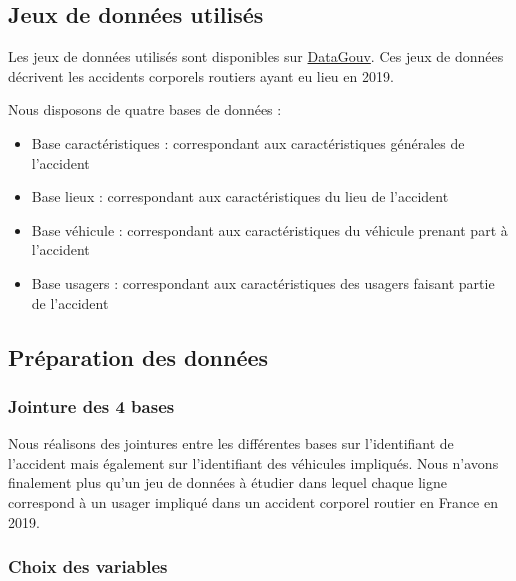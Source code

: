 \documentclass[french,]{tp}
\providecommand{\tightlist}{%
  \setlength{\itemsep}{0pt}\setlength{\parskip}{0pt}}
\begin{document}
\hypertarget{jeux-donnees}{%
\subsection{Jeux de données utilisés}\label{jeux-donnees}}

Les jeux de données utilisés sont disponibles sur \href{https://www.data.gouv.fr/fr/datasets/bases-de-donnees-annuelles-des-accidents-corporels-de-la-circulation-routiere-annees-de-2005-a-2019/}{DataGouv}. Ces jeux de données décrivent les accidents corporels routiers ayant eu lieu en 2019.

Nous disposons de quatre bases de données :

\begin{itemize}
\tightlist
\item
  Base caractéristiques : correspondant aux caractéristiques générales de l'accident
\item
  Base lieux : correspondant aux caractéristiques du lieu de l'accident
\item
  Base véhicule : correspondant aux caractéristiques du véhicule prenant part à l'accident
\item
  Base usagers : correspondant aux caractéristiques des usagers faisant partie de l'accident
\end{itemize}

\hypertarget{prepa-donnees}{%
\subsection{Préparation des données}\label{prepa-donnees}}

\hypertarget{jointure-des-4-bases}{%
\subsubsection{Jointure des 4 bases}\label{jointure-des-4-bases}}

Nous réalisons des jointures entre les différentes bases sur l'identifiant de l'accident mais également sur l'identifiant des véhicules impliqués. Nous n'avons finalement plus qu'un jeu de données à étudier dans lequel chaque ligne correspond à un usager impliqué dans un accident corporel routier en France en 2019.

\hypertarget{choix-des-variables}{%
\subsubsection{Choix des variables}\label{choix-des-variables}}
\end{document}
